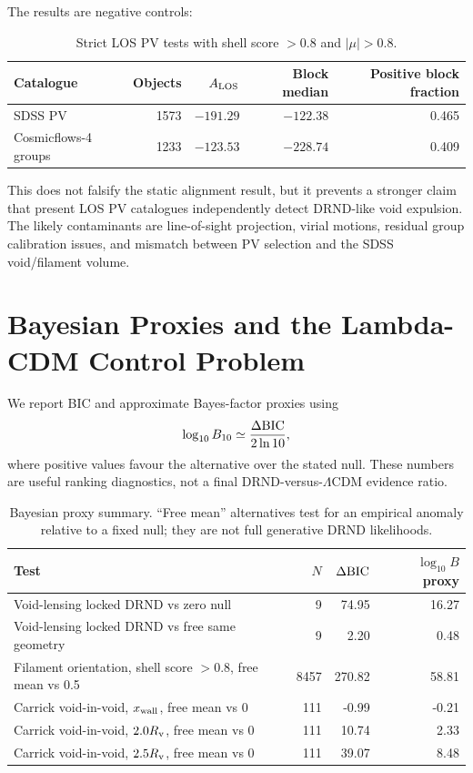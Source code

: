\documentclass[11pt,a4paper]{article}
\begin{document}
The results are negative controls:

\begin{table}[H]
\centering
\caption{Strict LOS PV tests with shell score $>0.8$ and $|\mu|>0.8$.}
\begin{tabular}{lrrrr}
\toprule
Catalogue & Objects & $A_{\rm LOS}$ & Block median & Positive block fraction \\
\midrule
SDSS PV & 1573 & $-191.29$ & $-122.38$ & 0.465 \\
Cosmicflows-4 groups & 1233 & $-123.53$ & $-228.74$ & 0.409 \\
\bottomrule
\end{tabular}
\end{table}

This does not falsify the static alignment result, but it prevents a stronger claim that present LOS PV catalogues independently detect DRND-like void expulsion. The likely contaminants are line-of-sight projection, virial motions, residual group calibration issues, and mismatch between PV selection and the SDSS void/filament volume.

\section{Bayesian Proxies and the Lambda-CDM Control Problem}

We report BIC and approximate Bayes-factor proxies using
\begin{equation}
\log_{10}B_{10}\simeq\frac{\Delta{\rm BIC}}{2\ln 10},
\end{equation}
where positive values favour the alternative over the stated null. These numbers are useful ranking diagnostics, not a final DRND-versus-$\Lambda$CDM evidence ratio.

\begin{table}[H]
\centering
\caption{Bayesian proxy summary. ``Free mean'' alternatives test for an empirical anomaly relative to a fixed null; they are not full generative DRND likelihoods.}
\begin{tabular}{lrrr}
\toprule
Test & $N$ & $\Delta{\rm BIC}$ & $\log_{10}B$ proxy \\
\midrule
Void-lensing locked DRND vs zero null & 9 & 74.95 & 16.27 \\
Void-lensing locked DRND vs free same geometry & 9 & 2.20 & 0.48 \\
Filament orientation, shell score $>0.8$, free mean vs 0.5 & 8457 & 270.82 & 58.81 \\
Carrick void-in-void, $x_{\rm wall}$, free mean vs 0 & 111 & -0.99 & -0.21 \\
Carrick void-in-void, $2.0R_{\rm v}$, free mean vs 0 & 111 & 10.74 & 2.33 \\
Carrick void-in-void, $2.5R_{\rm v}$, free mean vs 0 & 111 & 39.07 & 8.48 \\
\bottomrule
\end{tabular}
\end{table}
\end{document}
